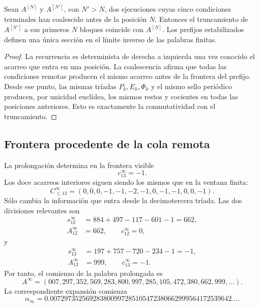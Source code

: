 \begin{theorem}
\label{p3-83-c25-s5:thm:compatibilidad-prolongacion-alpha}
Sean \(A^{[N]}\) y \(A^{[N']}\), con \(N'>N\), dos ejecuciones cuyas
cinco condiciones terminales han coalescido antes de la posición \(N\).
Entonces el truncamiento de \(A^{[N']}\) a sus primeros \(N\) bloques
coincide con \(A^{[N]}\). Los prefijos estabilizados definen una única
sección en el límite inverso de las palabras finitas.
\end{theorem}

\begin{proof}
La recurrencia es determinista de derecha a izquierda una vez conocido el
acarreo que entra en una posición. La coalescencia afirma que todas las
condiciones remotas producen el mismo acarreo antes de la frontera del
prefijo. Desde ese punto, las mismas tríadas \(P_k,E_k,\Phi_k\) y el mismo
sello periódico producen, por unicidad euclídea, los mismos restos y
cocientes en todas las posiciones anteriores. Esto es exactamente la
conmutatividad con el truncamiento.
\end{proof}

\subsection{Frontera procedente de la cola remota}

La prolongación determina en la frontera visible
\[
 c_{13}^{\infty}=-1.
\]
Los doce acarreos interiores siguen siendo los mismos que en la ventana
finita:
\[
 \boxed{
 C_{\leq13}^{\infty}
 =(0,0,0,-1,-1,-2,-1,0,-1,-1,0,0,-1).}
\]
Sólo cambia la información que entra desde la decimotercera tríada. Las
dos divisiones relevantes son
\[
\begin{aligned}
 s_{12}^{\infty}
 &=884+497-117-601-1=662,\\
 A_{12}^{\infty}&=662,
 \qquad c_{12}^{\infty}=0,
\end{aligned}
\]
y
\[
\begin{aligned}
 s_{13}^{\infty}
 &=197+757-720-234-1=-1,\\
 A_{13}^{\infty}&=999,
 \qquad c_{13}^{\infty}=-1.
\end{aligned}
\]
Por tanto, el comienzo de la palabra prolongada es
\[
 \boxed{
 A^{\infty}
 =(007,297,352,569,283,800,997,285,105,472,380,662,999,\ldots).}
\]
La correspondiente expansión comienza
\begin{equation}
 \boxed{
 \alpha_{\infty}
 =0.007297352569283800997285105472380662999564172539642\ldots.}
 \label{p3-83-c25-s5:eq:alpha-infinita-autonoma}
\end{equation}

